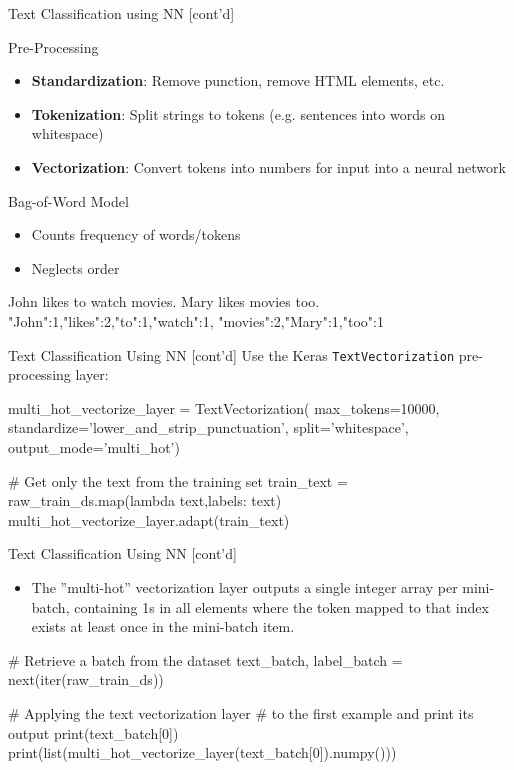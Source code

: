\documentclass[ignorenonframetext,xcolor=x11names]{beamer}
\begin{document}
\begin{frame}[fragile]{Text Classification using NN \small [cont'd]}
\begin{block}{Pre-Processing}
\begin{itemize}
   \item \textbf{Standardization}: Remove punction, remove HTML elements, etc.
   \item \textbf{Tokenization}: Split strings to tokens (e.g. sentences into words on whitespace)
   \item \textbf{Vectorization}: Convert tokens into numbers for input into a neural network
\end{itemize}
\end{block}
\begin{block}{Bag-of-Word Model}
\begin{itemize}
   \item Counts frequency of words/tokens
   \item Neglects order
\end{itemize}
\begin{textcode}
John likes to watch movies. Mary likes movies too.
{"John":1,"likes":2,"to":1,"watch":1,
 "movies":2,"Mary":1,"too":1}
\end{textcode}
\end{block}
\end{frame}


\begin{frame}[fragile]{Text Classification Using NN \small [cont'd]}
Use the Keras \texttt{TextVectorization} pre-processing layer:
\begin{pythoncode}
multi_hot_vectorize_layer = TextVectorization(
    max_tokens=10000,
    standardize='lower_and_strip_punctuation',
    split='whitespace',
    output_mode='multi_hot')
    
# Get only the text from the training set
train_text = raw_train_ds.map(lambda text,labels: text)
multi_hot_vectorize_layer.adapt(train_text)
\end{pythoncode}
\end{frame}


\begin{frame}[fragile]{Text Classification Using NN \small [cont'd]}
\begin{itemize}
   \item The ''multi-hot'' vectorization layer outputs a single integer array per mini-batch, containing 1s in all elements where the token mapped to that index exists at least once in the mini-batch item. 
\end{itemize}

\begin{pythoncode}
# Retrieve a batch from the dataset
text_batch, label_batch = next(iter(raw_train_ds))

# Applying the text vectorization layer 
# to the first example and print its output
print(text_batch[0])
print(list(multi_hot_vectorize_layer(text_batch[0]).numpy()))
\end{pythoncode}
\end{frame}
\end{document}
